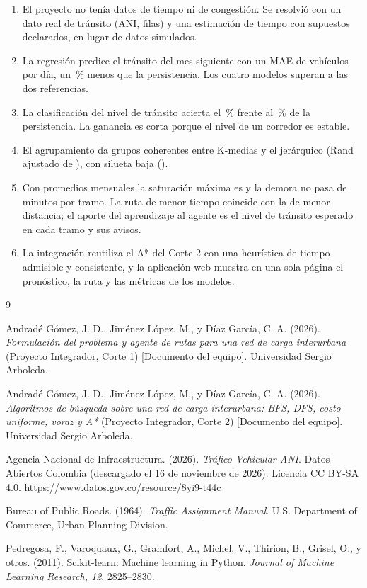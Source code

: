 \documentclass[12pt,a4paper]{article}
\begin{document}
\begin{enumerate}
\item El proyecto no tenía datos de tiempo ni de congestión. Se resolvió con
un dato real de tránsito (ANI, \ctFilasCrudas{} filas) y una estimación de
tiempo con supuestos declarados, en lugar de datos simulados.
\item La regresión predice el tránsito del mes siguiente con un MAE de
\ctMaeMejor{} vehículos por día, un \ctMejoraMae\,\% menos que la
persistencia. Los cuatro modelos superan a las dos referencias.
\item La clasificación del nivel de tránsito acierta el
\ctExactitudMejor\,\% frente al \ctExactitudPersistencia\,\% de la
persistencia. La ganancia es corta porque el nivel de un corredor es estable.
\item El agrupamiento da \ctKGrupos{} grupos coherentes entre K-medias y el
jerárquico (Rand ajustado de \ctRandAjustado), con silueta baja
(\ctSiluetaKmedias).
\item Con promedios mensuales la saturación máxima es \ctSaturacionMaxima{} y
la demora no pasa de \ctDemoraMaxima{} minutos por tramo. La ruta de menor
tiempo coincide con la de menor distancia; el aporte del aprendizaje al
agente es el nivel de tránsito esperado en cada tramo y sus avisos.
\item La integración reutiliza el A* del Corte 2 con una heurística de tiempo
admisible y consistente, y la aplicación web muestra en una sola página el
pronóstico, la ruta y las métricas de los modelos.
\end{enumerate}

\begin{thebibliography}{9}

Andradé Gómez, J. D., Jiménez López, M., y Díaz García, C. A. (2026).
\textit{Formulación del problema y agente de rutas para una red de carga
interurbana} (Proyecto Integrador, Corte 1) [Documento del equipo].
Universidad Sergio Arboleda.

Andradé Gómez, J. D., Jiménez López, M., y Díaz García, C. A. (2026).
\textit{Algoritmos de búsqueda sobre una red de carga interurbana: BFS, DFS,
costo uniforme, voraz y A*} (Proyecto Integrador, Corte 2) [Documento del
equipo]. Universidad Sergio Arboleda.

Agencia Nacional de Infraestructura. (2026). \textit{Tráfico Vehicular ANI}.
Datos Abiertos Colombia (descargado el 16 de noviembre de 2026). Licencia
CC BY-SA 4.0. \url{https://www.datos.gov.co/resource/8yi9-t44c}

Bureau of Public Roads. (1964). \textit{Traffic Assignment Manual}. U.S.
Department of Commerce, Urban Planning Division.

Pedregosa, F., Varoquaux, G., Gramfort, A., Michel, V., Thirion, B., Grisel,
O., y otros. (2011). Scikit-learn: Machine learning in Python. \textit{Journal
of Machine Learning Research, 12}, 2825--2830.

\end{thebibliography}
\end{document}
